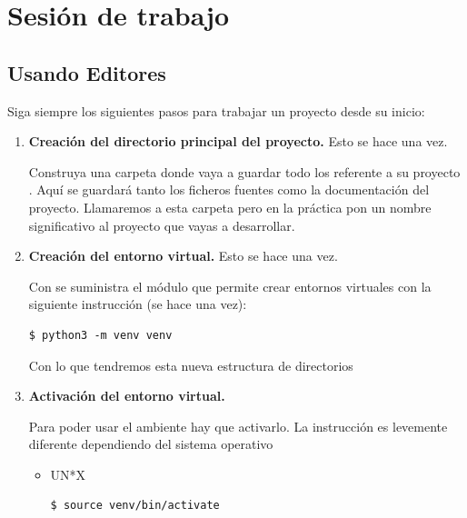 
\section{Sesión de trabajo} \label{sec:sesionTrabajo}


\subsection{Usando Editores}

Siga siempre los siguientes pasos para trabajar un proyecto desde su inicio:

\begin{enumerate}
\item \textbf{Creación del directorio principal del proyecto.} Esto se hace una vez.

 Construya una carpeta donde vaya a guardar todo los referente a su proyecto . 
 Aquí se guardará tanto los ficheros fuentes como la documentación del proyecto.
Llamaremos  a esta carpeta pero en la práctica pon un nombre significativo al proyecto que vayas a desarrollar.


\item \textbf{Creación del entorno virtual.} Esto se hace una vez.

Con   se suministra el módulo  que permite crear entornos virtuales con la siguiente instrucción (se hace una vez):
\begin{Verbatim}
$ python3 -m venv venv
\end{Verbatim}

Con lo que tendremos esta nueva estructura de directorios

\item \textbf{Activación del entorno virtual.} 

Para poder usar el ambiente hay que activarlo. La instrucción es levemente diferente dependiendo del sistema operativo

\begin{itemize}
\item UN*X
\begin{Verbatim}
$ source venv/bin/activate
\end{Verbatim}


\end{itemize}
\end{enumerate}
